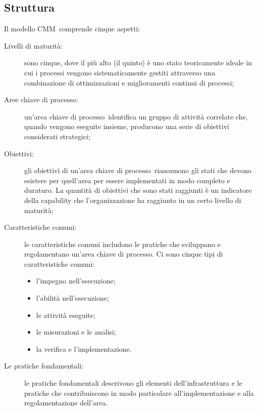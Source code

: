 \documentclass[../PianoDiQualifica.tex]{subfiles}
\begin{document}
\begin{appendices}
	\subsection{Struttura}
	Il modello CMM\g\ comprende cinque aspetti:
	\begin{description}
		\item[Livelli di maturità:] sono cinque, dove il più alto (il quinto) è uno stato teoricamente ideale in cui i processi vengono sistematicamente gestiti attraverso una combinazione di ottimizzazioni e miglioramenti continui di processi;
		\item[Aree chiave di processo\g:] un'area chiave di processo\g\ identifica un gruppo di attività correlate che, quando vengono eseguite insieme, producono una serie di obiettivi considerati strategici;
		\item[Obiettivi:] gli obiettivi di un'area chiave di processo\g\ riassumono gli stati che devono esistere per quell'area per essere implementati in modo completo e duraturo. La quantità di obiettivi che sono stati raggiunti è un indicatore della capability che l'organizzazione ha raggiunto in un certo livello di maturità;
		\item[Caratteristiche comuni:] le caratteristiche comuni includono le pratiche che sviluppano e regolamentano un'area chiave di processo\g. Ci sono cinque tipi di caratteristiche comuni:
		\begin{itemize}
			\item l'impegno nell'esecuzione;
			\item l'abilità nell'esecuzione;
			\item le attività eseguite;
			\item le misurazioni e le analisi;
			\item la verifica e l'implementazione.
		\end{itemize}
		\item[Le pratiche fondamentali:] le pratiche fondamentali descrivono gli elementi dell'infrastruttura e le pratiche che contribuiscono in modo particolare all'implementazione e alla regolamentazione dell'area.
	\end{description}

\end{appendices}
\end{document}
